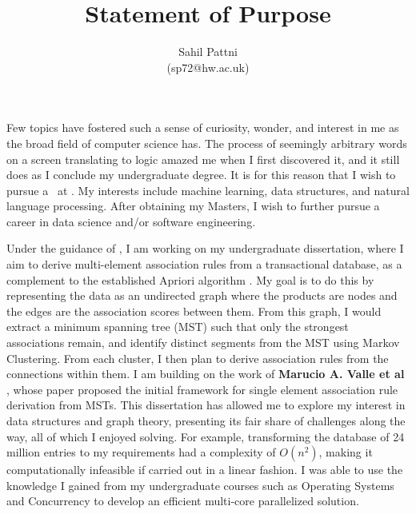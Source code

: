 \documentclass[a4paper,11pt]{article}
\begin{document}
\title{Statement of Purpose}

\author{Sahil Pattni\\(sp72@hw.ac.uk)}
\date{}
\maketitle

Few topics have fostered such a sense of curiosity, wonder, and interest in me as the broad field of computer science has. The process of seemingly arbitrary words on a screen translating to logic amazed me when I first discovered it, and it still does as I conclude my undergraduate degree. It is for this reason that I wish to pursue a \program\ at \uni. My interests include machine learning, data structures, and natural language processing. After obtaining my Masters, I wish to further pursue a career in data science and/or software engineering.


Under the guidance of \supervisor, I am working on my undergraduate dissertation, where I aim to derive multi-element association rules from a transactional database, as a complement to the established Apriori algorithm \cite{apriori}. My goal is to do this by representing the data as an undirected graph where the products are nodes and the edges are the association scores between them. From this graph, I would extract a minimum spanning tree (MST) such that only the strongest associations remain, and identify distinct segments from the MST using Markov Clustering. From each cluster, I then plan to derive association rules from the connections within them. I am building on the work of \textbf{Marucio A. Valle et al} \cite{mst_paper}, whose paper proposed the initial framework for single element association rule derivation from MSTs. This dissertation has allowed me to explore my interest in data structures and graph theory, presenting its fair share of challenges along the way, all of which I enjoyed solving. For example, transforming the database of 24 million entries to my requirements had a complexity of $O(n^2)$, making it computationally infeasible if carried out in a linear fashion. I was able to use the knowledge I gained from my undergraduate courses such as Operating Systems and Concurrency to develop an efficient multi-core parallelized solution.
\end{document}
